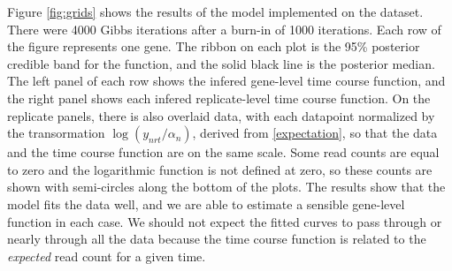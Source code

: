\documentclass[11pt]{article}
\newcommand{\1}{\mathbf{1}}
\newcommand{\0}{\mathbf{0}}
\begin{document}
Figure \ref{fig:grids} shows the results of the model implemented on the dataset. There were 4000 Gibbs iterations after a burn-in of 1000 iterations. Each row of the figure represents one gene. The ribbon on each plot is the 95\% posterior credible band for the function, and the solid black line is the posterior median. The left panel of each row shows the infered gene-level time course function, and the right panel shows each infered replicate-level time course function. On the replicate panels, there is also overlaid data, with each datapoint normalized by the transormation $\log(y_{nrt} / \alpha_n)$, derived from \ref{expectation}, so that the data and the time course function are on the same scale. Some read counts are equal to zero and the logarithmic function is not defined at zero, so these counts are shown with semi-circles along the bottom of the plots. The results show that the model fits the data well, and we are able to estimate a sensible gene-level function in each case. We should not expect the fitted curves to pass through or nearly through all the data because the time course function is related to the \emph{expected} read count for a given time.
\end{document}
